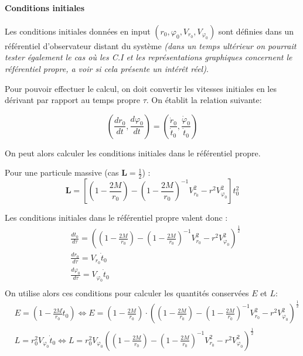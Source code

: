 \documentclass{article}
\begin{document}
\paragraph{Conditions initiales}
Les conditions initiales données en input $(r_0, \varphi_0, V_{r_0}, V_{\varphi_0})$ sont définies dans un référentiel d'observateur distant du système \emph{(dans un temps ultérieur on pourrait tester également le cas où les C.I et les représentations graphiques concernent le référentiel propre, a voir si cela présente un intérêt réel)}.

\newpage

Pour pouvoir effectuer le calcul, on doit convertir les vitesses initiales en les dérivant par rapport au temps propre $\tau$. On établit la relation suivante:

\[\left(\frac{dr_0}{dt}, \frac{d\varphi_0}{dt}\right)=\left(\frac{\dot r_0}{\dot t_0}, \frac{\dot \varphi _0}{\dot t_0}\right)\]
 
On peut alors calculer les conditions initiales dans le référentiel propre. 

Pour une particule massive (cas $\mathbf L=\frac{1}{2}$) :
\[\mathbf L=\left[\left(1-\frac{2M}{r_0}\right)-\left(1-\frac{2M}{r_0}\right)^{-1}V_{r_0}^2-r^2V_{\varphi _0}^2\right]t_0^2\]

Les conditions initiales dans le référentiel propre valent donc :
\begin{align*}
    &\frac{dt_0}{d\tau}=\left(\left(1-\frac{2M}{r_0}\right)-\left(1-\frac{2M}{r_0}\right)^{-1}V_{r_0}^2-r^2V_{\varphi _0}^2\right)^{\frac{1}{2}} \\
    &\frac{dr_0}{d\tau}=V_{r_0}\dot t_0\\
    &\frac{d\varphi _0}{d\tau}=V_{\varphi _0}\dot t_0\\
\end{align*}
On utilise alors ces conditions pour calculer les quantités conservées $E$ et $L$:
\begin{align*}&E=\left(1-\frac{2M}{r_0}\dot t_0\right) \iff E=\left(1-\frac{2M}{r_0}\right)\cdot\left(\left(1-\frac{2M}{r_0}\right)-\left(1-\frac{2M}{r_0}\right)^{-1}V_{r_0}^2-r^2V_{\varphi _0}^2\right)^{\frac{1}{2}} \\
&L = r_0^2 V_{\varphi_0}\dot t_0 \iff L= r_0^2 V_{\varphi_0}\left(\left(1-\frac{2M}{r_0}\right)-\left(1-\frac{2M}{r_0}\right)^{-1}V_{r_0}^2-r^2V_{\varphi _0}^2\right)^{\frac{1}{2}}\end{align*}
\end{document}
